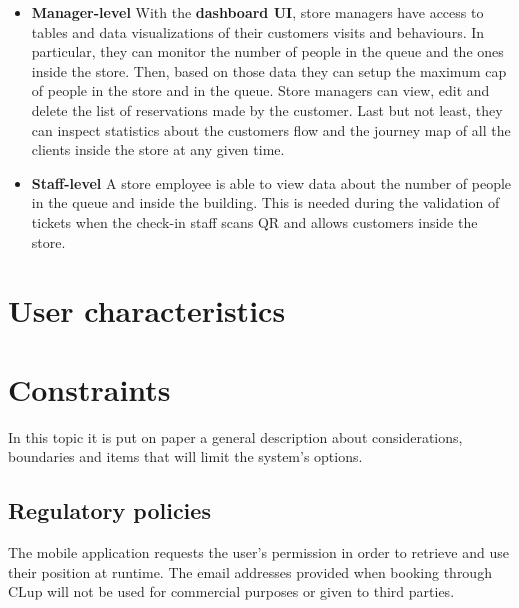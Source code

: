 \begin{itemize}
	\item \textbf{Manager-level}\newline
	With the \textbf{dashboard UI}, store managers have access to tables and data visualizations of their customers visits and behaviours. In particular, they can monitor the number of people in the queue and the ones inside the store. Then, based on those data they can setup the maximum cap of people in the store and in the queue.\newline
	Store managers can view, edit and delete the list of reservations made by the customer.\newline
	Last but not least, they can inspect statistics about the customers flow and the journey map of all the clients inside the store at any given time.

	\item \textbf{Staff-level}\newline
	A store employee is able to view data about the number of people in the queue and inside the building. This is needed during the validation of tickets when the check-in staff scans QR and allows customers inside the store.
\end{itemize}

\section{User characteristics}

\section{Constraints}
In this topic it is put on paper a general description about considerations, boundaries and items that will limit the system's options.

\subsection{Regulatory policies}
The mobile application requests the user's permission in order to retrieve and use their position at runtime. The email addresses provided when booking through CLup will not be used for commercial purposes or given to third parties.

